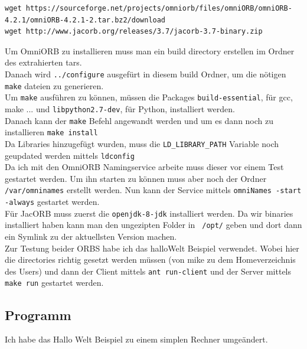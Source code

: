 \begin{lstlisting}[style=bash, caption=Download von OmniORB und JacORB]
wget https://sourceforge.net/projects/omniorb/files/omniORB/omniORB-4.2.1/omniORB-4.2.1-2.tar.bz2/download
wget http://www.jacorb.org/releases/3.7/jacorb-3.7-binary.zip
\end{lstlisting}

Um OmniORB zu installieren muss man ein build directory erstellen im Ordner des extrahierten tars. \\
Danach wird \texttt{../configure} ausgef\"urt in diesem build Ordner, um die n\"otigen \texttt{make} dateien zu generieren. \\
Um \texttt{make} ausf\"uhren zu k\"onnen, m\"ussen die Packages \texttt{build-essential}, f\"ur gcc, make ... und \texttt{libpython2.7-dev}, f\"ur Python, installiert werden.\\
Danach kann der \texttt{make} Befehl angewandt werden und um es dann noch zu installieren \texttt{make install}\\
Da Libraries hinzugef\"ugt wurden, muss die \texttt{LD\_LIBRARY\_PATH} Variable noch geupdated werden mittels \texttt{ldconfig} \\
Da ich mit den OmniORB Namingservice arbeite muss dieser vor einem Test gestartet werden. Um ihn starten zu k\"onnen muss aber noch der Ordner \texttt{/var/omninames} erstellt werden.
Nun kann der Service mittels \texttt{omniNames -start -always} gestartet werden.\\

F\"ur JacORB muss zuerst die \texttt{openjdk-8-jdk} installiert werden. Da wir binaries installiert haben kann man den ungezipten Folder in \texttt{~/opt/} geben und dort dann ein Symlink zu der aktuellsten Version machen.\\

Zur Testung beider ORBS habe ich das halloWelt Beispiel \cite{halloWelt-bsp} verwendet. Wobei hier die directories richtig gesetzt werden m\"ussen (von mike zu dem Homeverzeichnis des Users) und dann der Client mittels \texttt{ant run-client} und der Server mittels \texttt{make run} gestartet werden.

\clearpage

\subsection{Programm}

Ich habe das Hallo Welt Beispiel \cite{halloWelt-bsp} zu einem simplen Rechner umge\"andert. 

